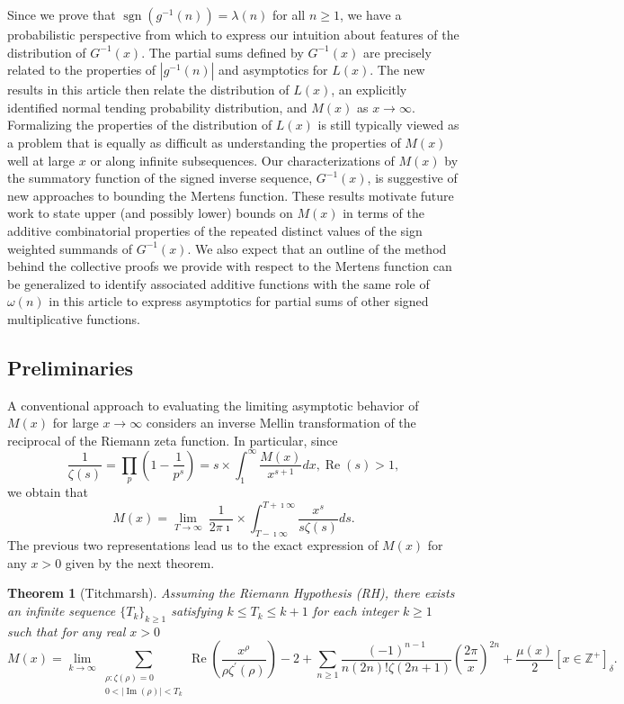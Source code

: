 \documentclass[11pt,reqno,a4letter]{article}
\numberwithin{figure}{section}
\numberwithin{table}{section}
\newcommand{\Iverson}[1]{\ensuremath{\left[#1\right]_{\delta}}}
\theoremstyle{plain}
\newtheorem{theorem}{Theorem}
\numberwithin{theorem}{section}
\theoremstyle{definition}
\renewcommand{\Re}{\operatorname{Re}}
\renewcommand{\Im}{\operatorname{Im}}
\begin{document}
Since we prove that $\operatorname{sgn}(g^{-1}(n)) = \lambda(n)$ for all $n \geq 1$, 
we have a probabilistic perspective from which to express 
our intuition about features of the distribution of $G^{-1}(x)$. 
The partial sums defined by $G^{-1}(x)$ are precisely related to the properties of 
$|g^{-1}(n)|$ and asymptotics for $L(x)$. 
The new results in this article then relate the 
distribution of $L(x)$, an explicitly identified 
normal tending probability distribution, and $M(x)$ as $x \rightarrow \infty$. 
Formalizing the properties of the distribution of 
$L(x)$ is still typically viewed as a problem that is equally as difficult 
as understanding the properties of $M(x)$ well at large $x$ or along infinite subsequences. 
Our characterizations of $M(x)$ by the summatory function of the signed 
inverse sequence, $G^{-1}(x)$, 
is suggestive of new approaches to bounding the Mertens function. 
These results motivate future work to state upper (and possibly lower) bounds 
on $M(x)$ in terms of the additive combinatorial properties of the repeated distinct 
values of the sign weighted summands of $G^{-1}(x)$. 
We also expect that an outline of the method behind the collective proofs we 
provide with respect to the Mertens function can be generalized to identify 
associated additive functions with the same role of $\omega(n)$ in this article to 
express asymptotics for partial sums of other signed multiplicative functions. 


\subsection{Preliminaries}
\label{subSection_Intro_Mx_properties} 

A conventional approach to evaluating the limiting asymptotic 
behavior of $M(x)$ for large $x \rightarrow \infty$ considers an 
inverse Mellin transformation of the reciprocal of the Riemann zeta function. 
In particular, since 
\[
\frac{1}{\zeta(s)} = \prod_{p} \left(1 - \frac{1}{p^s}\right) = 
     s \times \int_1^{\infty} \frac{M(x)}{x^{s+1}} dx, \Re(s) > 1, 
\]
we obtain that 
\[
M(x) = \lim_{T \rightarrow \infty}\ \frac{1}{2\pi\imath} \times \int_{T-\imath\infty}^{T+\imath\infty} 
     \frac{x^s}{s \zeta(s)} ds. 
\] 
The previous two representations lead us to the 
exact expression of $M(x)$ for any $x > 0$ 
given by the next theorem. 
\nocite{TITCHMARSH} 

\begin{theorem}[Titchmarsh] 
\label{theorem_MxMellinTransformInvFormula} 
Assuming the Riemann Hypothesis (RH), there exists an infinite sequence 
$\{T_k\}_{k \geq 1}$ satisfying $k \leq T_k \leq k+1$ for each integer $k \geq 1$ 
such that for any real $x > 0$ 
\[
M(x) = \lim_{k \rightarrow \infty} 
     \sum_{\substack{\rho: \zeta(\rho) = 0 \\ 0 < |\Im(\rho)| < T_k}} 
     \Re\left(\frac{x^{\rho}}{\rho \zeta^{\prime}(\rho)}\right) - 2 + 
     \sum_{n \geq 1} \frac{(-1)^{n-1}}{n (2n)! \zeta(2n+1)} 
     \left(\frac{2\pi}{x}\right)^{2n} + 
     \frac{\mu(x)}{2} \Iverson{x \in \mathbb{Z}^{+}}. 
\] 
\end{theorem} 
\end{document}
